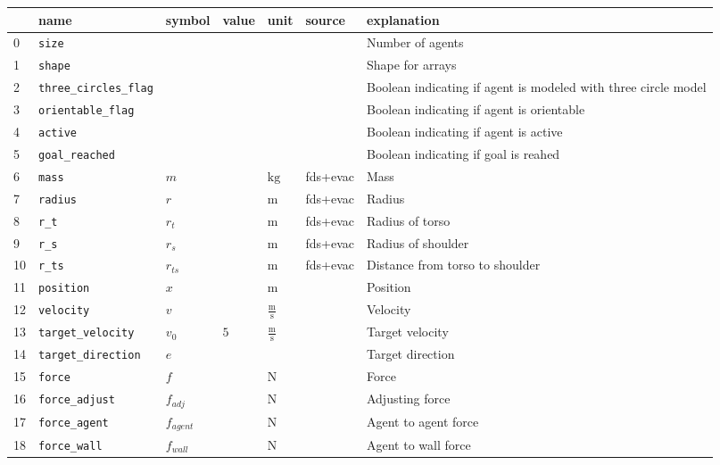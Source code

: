 \begin{tabular}{lllllll}
\toprule
{} &                            name &            symbol &                      value &                         unit &     source &                                                              explanation \\
\midrule
0  &  \verb|size| &   &   &   &   &  Number of agents \\
1  &  \verb|shape| &   &   &   &   &  Shape for arrays \\
2  &  \verb|three_circles_flag| &   &   &   &   &  Boolean indicating if agent is modeled with three circle model \\
3  &  \verb|orientable_flag| &   &   &   &   &  Boolean indicating if agent is orientable  \\
4  &  \verb|active| &   &   &   &   &  Boolean indicating if agent is active \\
5  &  \verb|goal_reached| &   &   &   &   &  Boolean indicating if goal is reahed \\
6  &  \verb|mass| &  $m$ &   &  $\mathrm{kg}$ &  fds+evac &  Mass \\
7  &  \verb|radius| &  $r$ &   &  $\mathrm{m}$ &  fds+evac &  Radius \\
8  &  \verb|r_t| &  $r_{t}$ &   &  $\mathrm{m}$ &  fds+evac &  Radius of torso \\
9  &  \verb|r_s| &  $r_{s}$ &   &  $\mathrm{m}$ &  fds+evac &  Radius of shoulder \\
10 &  \verb|r_ts| &  $r_{ts}$ &   &  $\mathrm{m}$ &  fds+evac &  Distance from torso to shoulder \\
11 &  \verb|position| &  $x$ &   &  $\mathrm{m}$ &   &  Position \\
12 &  \verb|velocity| &  $v$ &   &  $\mathrm{\frac{m}{s}}$ &   &  Velocity \\
13 &  \verb|target_velocity| &  $v_{0}$ &  $5$ &  $\mathrm{\frac{m}{s}}$ &   &  Target velocity \\
14 &  \verb|target_direction| &  $e$ &   &   &   &  Target direction \\
15 &  \verb|force| &  $f$ &   &  $\mathrm{N}$ &   &  Force \\
16 &  \verb|force_adjust| &  $f_{adj}$ &   &  $\mathrm{N}$ &   &  Adjusting force \\
17 &  \verb|force_agent| &  $f_{agent}$ &   &  $\mathrm{N}$ &   &  Agent to agent force \\
18 &  \verb|force_wall| &  $f_{wall}$ &   &  $\mathrm{N}$ &   &  Agent to wall force \\

\end{tabular}
